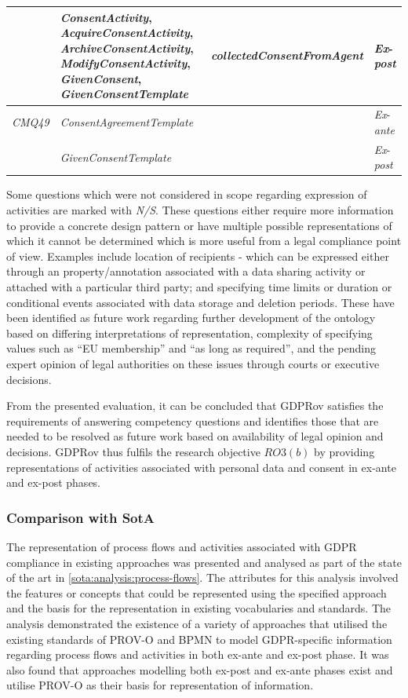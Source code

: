 \begin{table}[htbp]
\begin{tabularx}{\linewidth}{|l|X|p{5cm}|l|}
 & \textit{ConsentActivity}, \textit{AcquireConsentActivity}, \textit{ArchiveConsentActivity}, \textit{ModifyConsentActivity}, \textit{GivenConsent}, \textit{GivenConsentTemplate} & \textit{collectedConsentFromAgent} & \textit{Ex}-\textit{post} \\ \hline
\textit{CMQ49} & \textit{ConsentAgreementTemplate} &  & \textit{Ex}-\textit{ante} \\ \hline
 & \textit{GivenConsentTemplate} &  & \textit{Ex}-\textit{post} \\ \hline
\end{tabularx}
\label{table:gdprov:cq}
\end{table}

Some questions which were not considered in scope regarding expression of activities are marked with \textit{N/S}. These questions either require more information to provide a concrete design pattern or have multiple possible representations of which it cannot be determined which is more useful from a legal compliance point of view. Examples include location of recipients - which can be expressed either through an property/annotation associated with a data sharing activity or attached with a particular third party; and specifying time limits or duration or conditional events associated with data storage and deletion periods. These have been identified as future work regarding further development of the ontology based on differing interpretations of representation, complexity of specifying values such as ``EU membership'' and  ``as long as required'', and the pending expert opinion of legal authorities on these issues through courts or executive decisions.

From the presented evaluation, it can be concluded that GDPRov satisfies the requirements of answering  competency questions and identifies those that are needed to be resolved as future work based on availability of legal opinion and decisions. GDPRov thus fulfils the research objective $RO3(b)$ by providing representations of activities associated with personal data and consent in ex-ante and ex-post phases.

\subsubsection{Comparison with SotA}
The representation of process flows and activities associated with GDPR compliance in existing approaches was presented and analysed as part of the state of the art in \autoref{sota:analysis:process-flows}.
The attributes for this analysis involved the features or concepts that could be represented using the specified approach and the basis for the representation in existing vocabularies and standards.
The analysis demonstrated the existence of a variety of approaches that utilised the existing standards of PROV-O and BPMN to model GDPR-specific information regarding process flows and activities in both ex-ante and ex-post phase. It was also found that approaches modelling both ex-post and ex-ante phases exist and utilise PROV-O as their basis for representation of information.

